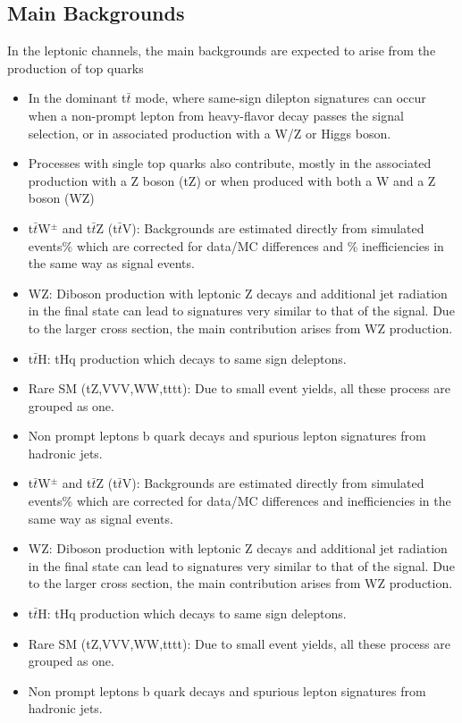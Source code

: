 \begin{linenumbers}
\section{Main Backgrounds}
In the leptonic channels, the main backgrounds are expected to
arise from the production of top quarks
\begin{itemize}
\item In the dominant t$\bar{t}$ mode, where 
same-sign dilepton signatures can occur when a non-prompt lepton from heavy-flavor
decay passes the signal selection, or in associated production with a W/Z or Higgs boson.
\item Processes with single top quarks also contribute, mostly in the associated production with a Z boson (tZ) or when produced with both a W and a Z boson (WZ) 
\item t$\bar{t}$W$^\pm$ and t$\bar{t}$Z (t$\bar{t}$V): Backgrounds are estimated directly from simulated events$\%$ which are corrected for data/MC differences and $\%$ inefficiencies in the same way as signal events. 
\item WZ: Diboson production with leptonic Z decays and additional jet radiation in the final state can
lead to signatures very similar to that of the signal. Due to the larger cross section, the main
contribution arises from WZ production.
\item t$\bar{t}$H: tHq production which decays to same sign deleptons.
\item Rare SM (tZ,VVV,WW,tttt): Due to small event yields, all these process are grouped as one.
\item Non prompt leptons b quark decays and spurious lepton signatures from hadronic jets.
\end{itemize}


\begin{itemize}
\item t$\bar{t}$W$^\pm$ and t$\bar{t}$Z (t$\bar{t}$V): Backgrounds are estimated directly from simulated events$\%$ which are corrected for data/MC differences and inefficiencies in the same way as signal events. 
\item WZ: Diboson production with leptonic Z decays and additional jet radiation in the final state can
lead to signatures very similar to that of the signal. Due to the larger cross section, the main
contribution arises from WZ production.
\item t$\bar{t}$H: tHq production which decays to same sign deleptons.
\item Rare SM (tZ,VVV,WW,tttt): Due to small event yields, all these process are grouped as one.
\item Non prompt leptons b quark decays and spurious lepton signatures from hadronic jets.
\end{itemize}


\end{linenumbers}
